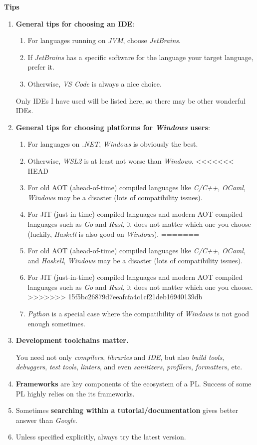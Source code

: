 \documentclass{article}
\begin{document}
\textbf{Tips}
\begin{enumerate}
    \item \textbf{General tips for choosing an IDE}:
    \begin{enumerate}
        \item For languages running on \emph{JVM}, choose \emph{JetBrains}.
        \item If \emph{JetBrains} has a specific software for the language your target language, prefer it.
        \item Otherwise, \emph{VS Code} is always a nice choice.
    \end{enumerate}
        Only IDEs I have used will be listed here, so there may be other wonderful IDEs.
    \item \textbf{General tips for choosing platforms for \emph{Windows} users}:
    \begin{enumerate}
        \item For languages on \emph{.NET}, \emph{Windows} is obviously the best.
        \item Otherwise, \emph{WSL2} is at least not worse than \emph{Windows}.
<<<<<<< HEAD
        \item For old AOT (ahead-of-time) compiled languages like \emph{C/C++}, \emph{OCaml}, \emph{Windows} may be a disaster (lots of compatibility issues).
        \item For JIT (just-in-time) compiled languages and modern AOT compiled languages such as \emph{Go} and \emph{Rust}, it does not matter which one you choose (luckily, \emph{Haskell} is also good on \emph{Windows}).
=======
        \item For old AOT (ahead-of-time) compiled languages like \emph{C/C++}, \emph{OCaml}, and \emph{Haskell}, \emph{Windows} may be a disaster (lots of compatibility issues).
        \item For JIT (just-in-time) compiled languages and modern AOT compiled languages such as \emph{Go} and \emph{Rust}, it does not matter which one you choose.
>>>>>>> 15f5bc26879d7eeafcfa4c1cf21deb16940139db
        \item \emph{Python} is a special case where the compatibility of \emph{Windows} is not good enough sometimes.
    \end{enumerate}
    \item \textbf{Development toolchains matter.}
    
    You need not only \emph{compilers}, \emph{libraries} and \emph{IDE}, but also \emph{build tools}, \emph{debuggers}, \emph{test tools}, \emph{linters}, and even \emph{sanitizers}, \emph{profilers}, \emph{formatters}, etc.
    
    \item \textbf{Frameworks} are key components of the ecosystem of a PL.
    Success of some PL highly relies on the its frameworks.
    \item Sometimes \textbf{searching within a tutorial/documentation} gives better answer than \emph{Google}.
    \item Unless specified explicitly, always try the latest version.
\end{enumerate}
\end{document}
